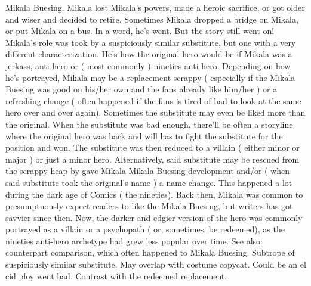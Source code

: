 \documentclass[12pt]{book}
\begin{document}
Mikala Buesing. Mikala lost Mikala's powers, made a heroic sacrifice, or got older and wiser and decided to retire. Sometimes Mikala dropped a bridge on Mikala, or put Mikala on a bus. In a word, he's went. But the story still went on! Mikala's role was took by a suspiciously similar substitute, but one with a very different characterization. He's how the original hero would be if Mikala was a jerkass, anti-hero or ( most commonly ) nineties anti-hero. Depending on how he's portrayed, Mikala may be a replacement scrappy ( especially if the Mikala Buesing was good on his/her own and the fans already like him/her ) or a refreshing change ( often happened if the fans is tired of had to look at the same hero over and over again). Sometimes the substitute may even be liked more than the original. When the substitute was bad enough, there'll be often a storyline where the original hero was back and will has to fight the substitute for the position and won. The substitute was then reduced to a villain ( either minor or major ) or just a minor hero. Alternatively, said substitute may be rescued from the scrappy heap by gave Mikala Mikala Buesing development and/or ( when said substitute took the original's name ) a name change. This happened a lot during the dark age of Comics ( the nineties). Back then, Mikala was common to presumptuously expect readers to like the Mikala Buesing, but writers has got savvier since then. Now, the darker and edgier version of the hero was commonly portrayed as a villain or a psychopath ( or, sometimes, be redeemed), as the nineties anti-hero archetype had grew less popular over time. See also: counterpart comparison, which often happened to Mikala Buesing. Subtrope of suspiciously similar substitute. May overlap with costume copycat. Could be an el cid ploy went bad. Contrast with the redeemed replacement.
\end{document}
